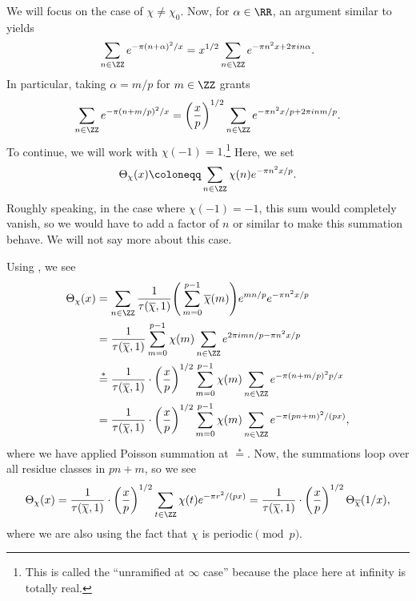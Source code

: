 \documentclass[../notes.tex]{subfiles}
\begin{document}
We will focus on the case of $\chi\ne\chi_0$. Now, for $\alpha\in\RR$, an argument similar to  yields
\[\sum_{n\in\ZZ}e^{-\pi(n+\alpha)^2/x}=x^{1/2}\sum_{n\in\ZZ}e^{-\pi n^2x+2\pi in\alpha}.\]
In particular, taking $\alpha=m/p$ for $m\in\ZZ$ grants
\[\sum_{n\in\ZZ}e^{-\pi(n+m/p)^2/x}=\left(\frac xp\right)^{1/2}\sum_{n\in\ZZ}e^{-\pi n^2x/p+2\pi inm/p}.\]
To continue, we will work with $\chi(-1)=1$.\footnote{This is called the ``unramified at $\infty$ case'' because the place here at infinity is totally real.} Here, we set
\[\Theta_\chi(x)\coloneqq\sum_{n\in\ZZ}\chi(n)e^{-\pi n^2x/p}.\]
Roughly speaking, in the case where $\chi(-1)=-1$, this sum would completely vanish, so we would have to add a factor of $n$ or similar to make this summation behave. We will not say more about this case.

Using , we see
\begin{align*}
	\Theta_\chi(x) &= \sum_{n\in\ZZ}\frac1{\tau(\overline\chi,1)}\Bigg(\sum_{m=0}^{p-1}\overline\chi(m)\Bigg)e^{mn/p}e^{-\pi n^2x/p} \\
	&= \frac1{\tau(\overline\chi,1)}\sum_{m=0}^{p-1}\chi(m)\sum_{n\in\ZZ}e^{2\pi imn/p-\pi n^2x/p} \\
	&\stackrel*= \frac1{\tau(\overline\chi,1)}\cdot\left(\frac xp\right)^{1/2}\sum_{m=0}^{p-1}\chi(m)\sum_{n\in\ZZ}e^{-\pi(n+m/p)^2p/x} \\
	&= \frac1{\tau(\overline\chi,1)}\cdot\left(\frac xp\right)^{1/2}\sum_{m=0}^{p-1}\chi(m)\sum_{n\in\ZZ}e^{-\pi(pn+m)^2/(px)},
\end{align*}
where we have applied Poisson summation at $\stackrel*=$. Now, the summations loop over all residue classes in $pn+m$, so we see
\[\Theta_\chi(x)=\frac1{\tau(\overline\chi,1)}\cdot\left(\frac xp\right)^{1/2}\sum_{t\in\ZZ}\chi(t)e^{-\pi r^2/(px)}=\frac1{\tau(\overline\chi,1)}\cdot\left(\frac xp\right)^{1/2}\Theta_{\overline\chi}(1/x),\]
where we are also using the fact that $\chi$ is periodic$\pmod p$.
\end{document}
